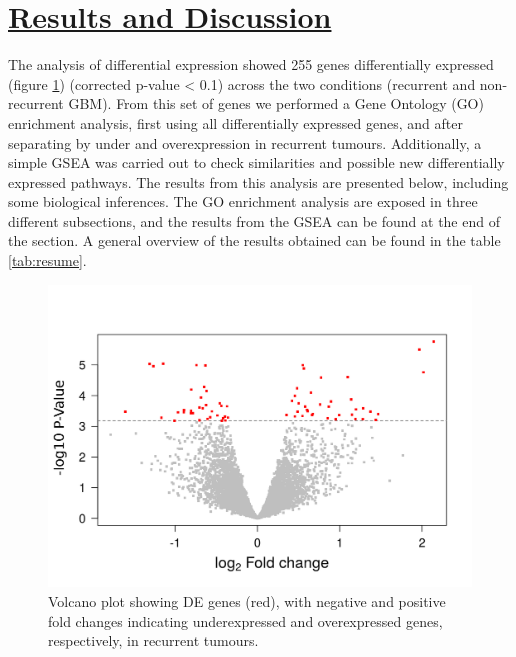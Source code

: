 \documentclass[9pt,twocolumn,twoside]{gsajnl}
\begin{document}
\section*{\underline{Results and Discussion}}

The analysis of differential expression showed 255 genes differentially expressed (figure \ref{fig:volcano}) (corrected p-value < 0.1) across the two conditions (recurrent and non-recurrent GBM). From this set of genes we performed a Gene Ontology (GO) enrichment analysis, first using all differentially expressed genes, and after separating by under and overexpression in recurrent tumours. Additionally, a simple GSEA was carried out to check similarities and possible new differentially expressed pathways. The results from this analysis are presented below, including some biological inferences. The GO enrichment analysis are exposed in three different subsections, and the results from the GSEA can be found at the end of the section. A general overview of the results obtained can be found in the table \ref{tab:resume}.

\begin{figure}[!h]
	\centering
	\includegraphics[scale=0.4]{volcano.png}
	\caption{Volcano plot showing DE genes (red), with negative and positive fold changes indicating underexpressed and overexpressed genes, respectively, in recurrent tumours.}
	\label{fig:volcano}
\end{figure}
\end{document}
